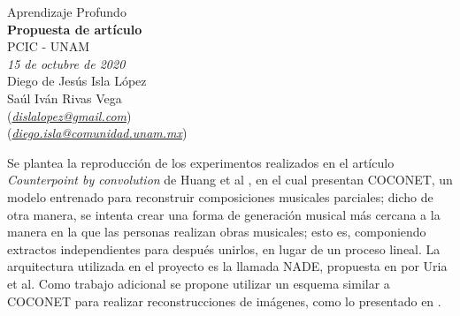 \documentclass[letterpaper,12pt]{article}
\theoremstyle{definition}
\begin{document}
\begin{center}
  {\large Aprendizaje Profundo}\\
  \vspace{0.2cm}
  {\large\bfseries Propuesta de artículo}\\
  \vspace{0.2cm}
  {\large PCIC - UNAM}\\
  \vspace{0.5cm}
  {\itshape 15 de octubre de 2020}\\
  \vspace{0.5cm}
  Diego de Jesús Isla López\\
  Saúl Iván Rivas Vega\\
  (\href{mailto:dislalopez@gmail.com}{\itshape dislalopez@gmail.com})\\
  (\href{mailto:diego.isla@comunidad.unam.mx}{\itshape diego.isla@comunidad.unam.mx})\\
\end{center}

Se plantea la reproducción de los experimentos realizados en el artículo \textit{Counterpoint by convolution} de Huang et al \cite{DBLP:journals/corr/abs-1903-07227}, en el cual presentan COCONET, un modelo entrenado para reconstruir composiciones musicales parciales; dicho de otra manera, se intenta crear una forma de generación musical más cercana a la manera en la que las personas realizan obras musicales; esto es, componiendo extractos independientes para después unirlos, en lugar de un proceso lineal. La arquitectura utilizada en el proyecto es la llamada NADE, propuesta en \cite{DBLP:journals/corr/UriaCGML16} por Uria et al. Como trabajo adicional se propone utilizar un esquema similar a COCONET para realizar reconstrucciones de imágenes, como lo presentado en \cite{DBLP:journals/corr/abs-1802-05751}. 




\end{document}
